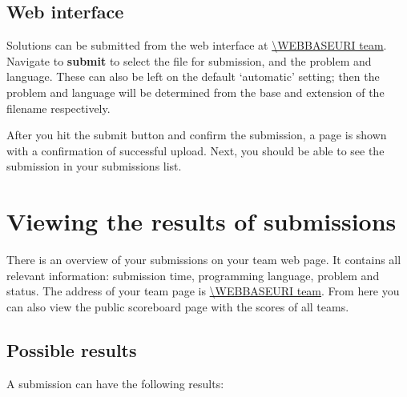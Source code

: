 \subsection{Web interface}

Solutions can be submitted from the web interface at \url{\WEBBASEURI team}.
Navigate to \textbf{submit} to select the file for submission, and the
problem and language. These can also be left on the default
`automatic' setting; then the problem and language will be determined
from the base and extension of the filename respectively.

After you hit the submit button and confirm the submission, a page is
shown with a confirmation of successful upload. Next, you should be
able to see the submission in your submissions list.

\section{Viewing the results of submissions}

There is an overview of your submissions on your team web page.
It contains all relevant information: submission time, programming
language, problem and status. The address of your team page is
\url{\WEBBASEURI team}. From here you can also view the public
scoreboard page with the scores of all teams.

\subsection{Possible results}

A submission can have the following results:

